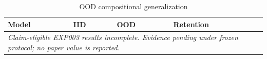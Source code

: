 \begin{table}[t]
\centering
\caption{OOD compositional generalization}
\begin{tabular}{llll}
\toprule
Model & IID & OOD & Retention \\
\midrule
\multicolumn{4}{l}{\textit{Claim-eligible EXP003 results incomplete. Evidence pending under frozen protocol; no paper value is reported.}} \\
\bottomrule
\end{tabular}
\end{table}
